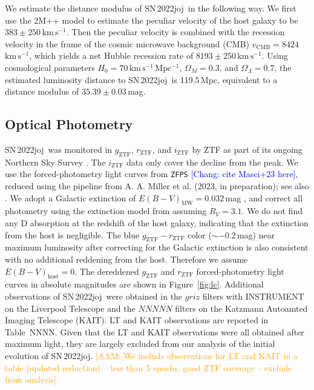 \documentclass[twocolumn]{aastex631}
\newcommand{\sn}{SN\,2022joj}
\newcommand{\kms}{$\mathrm{km}\,\mathrm{s}^{-1}$}
\newcommand{\adam}[1]{\textcolor{orange}{[AAM: #1]}}
\newcommand{\chang}[1]{\textcolor{blue}{[Chang: #1]}}
\begin{document}
\begin{CJK*}{UTF8}{gbsn}
We estimate the distance modulus of \sn\ in the following way. We first use the 2M++ model \citep{Carrick2015_2M++} to estimate the peculiar velocity of the host galaxy to be $383\pm250$\,\kms. Then the peculiar velocity is combined with the recession velocity in the frame of the cosmic microwave background (CMB) $v_\mathrm{CMB}=8424$\,\kms, which yields a net Hubble recession rate of $8193\pm250$\,\kms. Using cosmological parameters $H_0 = 70\,\mathrm{km\,s^{-1}\,Mpc^{-1}}$, $\Omega_M=0.3$, and $\Omega_\Lambda=0.7$, the estimated luminosity distance to \sn\ is 119.5\,Mpc, equivalent to a distance modulus of $35.39\pm0.03$\,mag.

\subsection{Optical Photometry}
\sn\ was monitored in $g_\mathrm{ZTF}$, $r_\mathrm{ZTF}$, and $i_\mathrm{ZTF}$ by ZTF as part of its ongoing Northern Sky Survey \citep{Bellm_ZTF_2019b}. The $i_\mathrm{ZTF}$ data only cover the decline from the peak. We use the forced-photometry light curves from \texttt{ZFPS} \chang{cite Masci+23 here}, reduced using the pipeline from A. A. Miller et al. (2023, in preparation); see also \citet{Yao_2019}. We adopt a Galactic extinction of ${E(B-V)_\mathrm{MW}}=0.032$\,mag \citep{Schlafly2011}, and correct all photometry using the extinction model from \citet{Fitzpatrick1999} assuming $R_V=3.1$. We do not find any  D absorption at the redshift of the host galaxy, indicating that the extinction from the host is negligible. The blue $g_\mathrm{ZTF}-r_\mathrm{ZTF}$ color ($\sim$$-0.2$\,mag) near maximum luminosity after correcting for the Galactic extinction is also consistent with no additional reddening from the host. Therefore we assume ${E(B-V)}_\mathrm{host}=0$. The dereddened $g_\mathrm{ZTF}$ and $r_\mathrm{ZTF}$ forced-photometry light curves in absolute magnitudes are shown in Figure~\ref{fig:lc}. 
    Additional observations of \sn\ were obtained in the $griz$ filters with INSTRUMENT on the Liverpool Telescope and the $NNNNN$ filters on the Katzmann Autoamted Imaging Telescope (KAIT). LT and KAIT observations are reported in Table~NNNN. Given that the LT and KAIT observations were all obtained after maximum light, they are largely excluded from our analysis of the initial evolution of \sn. \adam{We include observations for LT and KAIT in a table (updated reduction) -- less than 5 epochs, good ZTF coverage -- exclude from analysis}


\end{CJK*}
\end{document}
